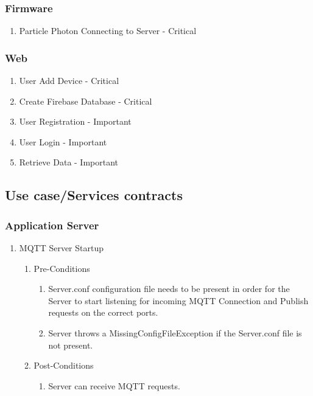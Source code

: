 \documentclass{article}
\begin{document}
	\subsubsection{Firmware}
	\begin{enumerate}
		\item	Particle Photon Connecting to Server - Critical
	\end{enumerate}
	\subsubsection{Web}
	\begin{enumerate}
		\item	User Add Device - Critical
		\item	Create Firebase Database - Critical
		\item	User Registration - Important
		\item	User Login - Important
		\item	Retrieve Data  - Important
	\end{enumerate}
	\subsection{Use case/Services contracts}
	\subsubsection{Application Server}
	\begin{enumerate}
		\item	MQTT Server Startup
		\begin{enumerate}
			\item  Pre-Conditions
			\begin{enumerate}
				\item  	Server.conf configuration file needs to be present in order for the Server to start listening for incoming MQTT Connection and 
				Publish requests on the correct ports.
				\item	Server throws a MissingConfigFileException if the Server.conf file is not present.
			\end{enumerate}
			\item  Post-Conditions		
			\begin{enumerate}
				\item	Server can receive MQTT requests.
			\end{enumerate}
		\end{enumerate}
	\end{enumerate}
\end{document}
